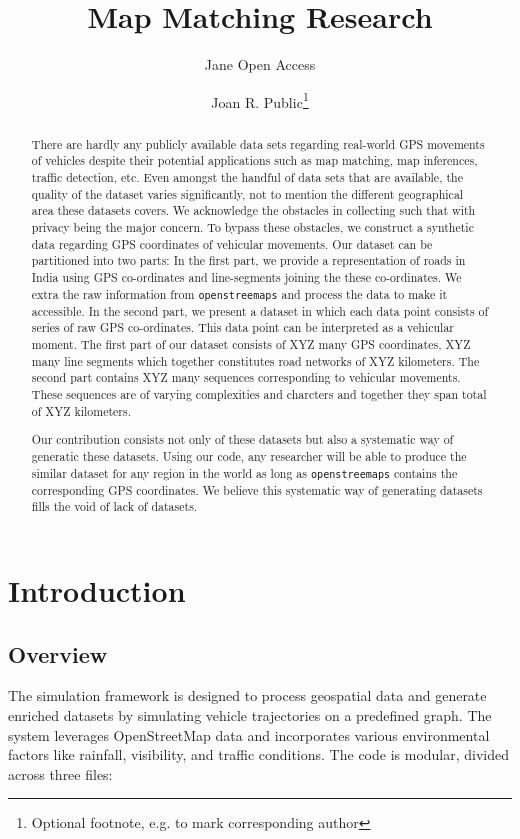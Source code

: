 \documentclass[a4paper,UKenglish,cleveref, autoref, thm-restate]{lipics-v2021}
\title{Map Matching Research} %
\author{Jane {Open Access}}{Dummy University Computing Laboratory, [optional: Address], Country \and My second affiliation, Country \and \url{http://www.myhomepage.edu} }{johnqpublic@dummyuni.org}{https://orcid.org/0000-0002-1825-0097}{(Optional) author-specific funding acknowledgements}%
\author{Joan R. Public\footnote{Optional footnote, e.g. to mark corresponding author}}{Department of Informatics, Dummy College, [optional: Address], Country}{joanrpublic@dummycollege.org}{[orcid]}{[funding]}
\begin{document}
\maketitle

\begin{abstract}
There are hardly any publicly available data sets regarding real-world
GPS movements of vehicles despite their potential applications such as
map matching, map inferences, traffic detection, etc.
Even amongst the handful of data sets that are available, the quality
of the dataset varies significantly, not to mention the different
geographical area these datasets covers.
We acknowledge the obstacles in collecting such that with
privacy being the major concern. 
To bypass these obstacles, we construct a synthetic data 
regarding GPS coordinates of vehicular movements.
Our dataset can be partitioned into two parts:
In the first part, we provide a representation of roads in India
using GPS co-ordinates and line-segments joining the 
these co-ordinates.
We extra the raw information from \texttt{openstreemaps}
and process the data to make it accessible.
In the second part, we present a dataset 
in which each data point consists of series 
of raw GPS co-ordinates.
This data point can be interpreted as a vehicular moment. 
The first part of our dataset consists of XYZ many GPS coordinates,
XYZ many line segments which together constitutes road networks
of XYZ kilometers.
The second part contains XYZ many sequences corresponding
to vehicular movements.
These sequences are of varying complexities and charcters
and together they span total of XYZ kilometers. 

Our contribution consists not only of these datasets but also
a systematic way of generatic these datasets. 
Using our code, any researcher will be able to produce
the similar dataset for any region in the world as long 
as \texttt{openstreemaps} contains the corresponding GPS coordinates.
We believe this systematic way of generating datasets
fills the void of lack of datasets.
\end{abstract}


\section{Introduction}
\subsection{Overview}
The simulation framework is designed to process geospatial data and generate enriched datasets by simulating vehicle trajectories on a predefined graph. The system leverages OpenStreetMap data and incorporates various environmental factors like rainfall, visibility, and traffic conditions. The code is modular, divided across three files:
\end{document}
